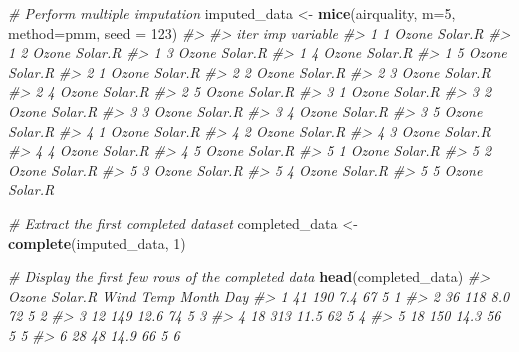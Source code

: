 \documentclass[
]{book}
\newenvironment{Shaded}{\begin{snugshade}}{\end{snugshade}}
\newcommand{\AttributeTok}[1]{\textcolor[rgb]{0.13,0.29,0.53}{#1}}
\newcommand{\CommentTok}[1]{\textcolor[rgb]{0.56,0.35,0.01}{\textit{#1}}}
\newcommand{\DecValTok}[1]{\textcolor[rgb]{0.00,0.00,0.81}{#1}}
\newcommand{\FunctionTok}[1]{\textcolor[rgb]{0.13,0.29,0.53}{\textbf{#1}}}
\newcommand{\NormalTok}[1]{#1}
\newcommand{\OtherTok}[1]{\textcolor[rgb]{0.56,0.35,0.01}{#1}}
\newcommand{\StringTok}[1]{\textcolor[rgb]{0.31,0.60,0.02}{#1}}
\begin{document}
\begin{Shaded}
\begin{Highlighting}[]
\CommentTok{\# Perform multiple imputation}
\NormalTok{imputed\_data }\OtherTok{\textless{}{-}} \FunctionTok{mice}\NormalTok{(airquality, }\AttributeTok{m=}\DecValTok{5}\NormalTok{, }\AttributeTok{method=}\StringTok{\textquotesingle{}pmm\textquotesingle{}}\NormalTok{, }\AttributeTok{seed =} \DecValTok{123}\NormalTok{)}
\CommentTok{\#\textgreater{} }
\CommentTok{\#\textgreater{}  iter imp variable}
\CommentTok{\#\textgreater{}   1   1  Ozone  Solar.R}
\CommentTok{\#\textgreater{}   1   2  Ozone  Solar.R}
\CommentTok{\#\textgreater{}   1   3  Ozone  Solar.R}
\CommentTok{\#\textgreater{}   1   4  Ozone  Solar.R}
\CommentTok{\#\textgreater{}   1   5  Ozone  Solar.R}
\CommentTok{\#\textgreater{}   2   1  Ozone  Solar.R}
\CommentTok{\#\textgreater{}   2   2  Ozone  Solar.R}
\CommentTok{\#\textgreater{}   2   3  Ozone  Solar.R}
\CommentTok{\#\textgreater{}   2   4  Ozone  Solar.R}
\CommentTok{\#\textgreater{}   2   5  Ozone  Solar.R}
\CommentTok{\#\textgreater{}   3   1  Ozone  Solar.R}
\CommentTok{\#\textgreater{}   3   2  Ozone  Solar.R}
\CommentTok{\#\textgreater{}   3   3  Ozone  Solar.R}
\CommentTok{\#\textgreater{}   3   4  Ozone  Solar.R}
\CommentTok{\#\textgreater{}   3   5  Ozone  Solar.R}
\CommentTok{\#\textgreater{}   4   1  Ozone  Solar.R}
\CommentTok{\#\textgreater{}   4   2  Ozone  Solar.R}
\CommentTok{\#\textgreater{}   4   3  Ozone  Solar.R}
\CommentTok{\#\textgreater{}   4   4  Ozone  Solar.R}
\CommentTok{\#\textgreater{}   4   5  Ozone  Solar.R}
\CommentTok{\#\textgreater{}   5   1  Ozone  Solar.R}
\CommentTok{\#\textgreater{}   5   2  Ozone  Solar.R}
\CommentTok{\#\textgreater{}   5   3  Ozone  Solar.R}
\CommentTok{\#\textgreater{}   5   4  Ozone  Solar.R}
\CommentTok{\#\textgreater{}   5   5  Ozone  Solar.R}

\CommentTok{\# Extract the first completed dataset}
\NormalTok{completed\_data }\OtherTok{\textless{}{-}} \FunctionTok{complete}\NormalTok{(imputed\_data, }\DecValTok{1}\NormalTok{)}

\CommentTok{\# Display the first few rows of the completed data}
\FunctionTok{head}\NormalTok{(completed\_data)}
\CommentTok{\#\textgreater{}   Ozone Solar.R Wind Temp Month Day}
\CommentTok{\#\textgreater{} 1    41     190  7.4   67     5   1}
\CommentTok{\#\textgreater{} 2    36     118  8.0   72     5   2}
\CommentTok{\#\textgreater{} 3    12     149 12.6   74     5   3}
\CommentTok{\#\textgreater{} 4    18     313 11.5   62     5   4}
\CommentTok{\#\textgreater{} 5    18     150 14.3   56     5   5}
\CommentTok{\#\textgreater{} 6    28      48 14.9   66     5   6}
\end{Highlighting}
\end{Shaded}
\end{document}
